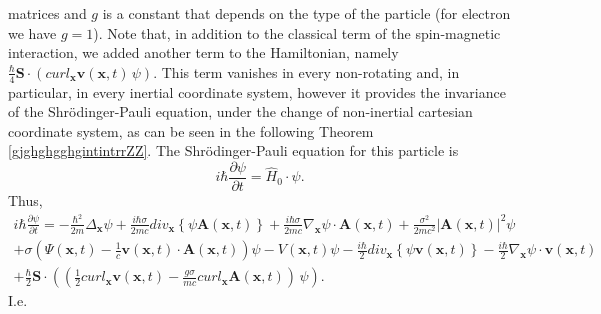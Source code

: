 \documentclass{article}
\theoremstyle{definition}
\theoremstyle{remark}
\renewcommand{\vec}[1]{\mathbf{#1}}
\begin{document}
matrices and $g$ is a constant that depends on the type of the
particle (for electron we have $g=1$). Note that, in addition to the
classical term of the spin-magnetic interaction, we added another
term to the Hamiltonian, namely $\frac{\hbar}{4}\vec
S\cdot\left(curl_{\vec x}\vec v(\vec x,t)\,\psi\right)$. This term
vanishes in every non-rotating and, in particular, in every inertial
coordinate system, however it provides the invariance of the
Shr\"{o}dinger-Pauli equation, under the change of non-inertial
cartesian coordinate system, as can be seen in the following Theorem
\ref{gjghghgghgintintrrZZ}. The Shr\"{o}dinger-Pauli equation for
this particle is
\begin{equation}\label{vhfffngghkjgghfjjghghghhjghjgghkghggkghghjghSYSPNnnkkllkkkZZ}
i\hbar\frac{\partial\psi}{\partial t}=\hat H_0\cdot\psi.
\end{equation}
 Thus,
\begin{multline}\label{vhfffngghkjgghfjjghghghSYShmyuuiiuuhmhmiopoopnniukjhjkk;l;lkhjjkihjjhkkkkkZZ}
i\hbar\frac{\partial\psi}{\partial
t}=-\frac{\hbar^2}{2m}\Delta_{\vec
x}\psi+\frac{i\hbar\sigma}{2mc}div_{\vec x}\left\{\psi\vec A(\vec
x,t)\right\}+\frac{i\hbar\sigma}{2mc}\nabla_{\vec x}\psi\cdot\vec
A(\vec x,t)+\frac{\sigma^2}{2mc^2}\left|\vec A(\vec
x,t)\right|^2\psi\\
%
%
%
+\sigma\left(\Psi(\vec x,t)-\frac{1}{c}\vec v(\vec x,t)\cdot\vec
A(\vec x,t)\right)\psi-V\left(\vec
x,t\right)\psi-\frac{i\hbar}{2}div_{\vec x}\left\{\psi\vec v(\vec
x,t)\right\}-\frac{i\hbar}{2}\nabla_{\vec x}\psi\cdot\vec v(\vec
x,t)\\+\frac{\hbar}{2}\vec S\cdot\left(\left(\frac{1}{2}curl_{\vec
x}\vec v(\vec x,t)-\frac{g\sigma}{mc}curl_{\vec x}\vec A(\vec
x,t)\right)\,\psi\right).
\end{multline}
I.e.
\end{document}
